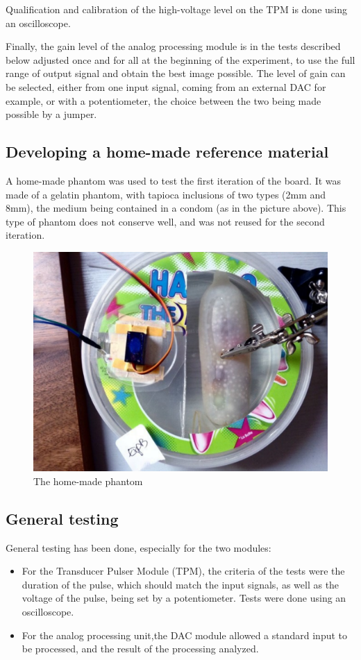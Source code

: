 \documentclass[letterpaper, 10 pt, conference]{ieeeconf} %
\begin{document}
Qualification and calibration of the high-voltage level on the TPM is done using an oscilloscope.

Finally, the gain level of the analog processing module is in the tests described below adjusted once and for all at the beginning of the experiment, to use the full range of output signal and obtain the best image possible. The level of gain can be selected, either from one input signal, coming from an external DAC for example, or with a potentiometer, the choice between the two being made possible by a jumper.

\subsection{Developing a home-made reference material}

A home-made phantom was used to test the first iteration of the board. It was made of a gelatin phantom, with tapioca inclusions of two types (2mm and 8mm), the medium being contained in a condom (as in the picture above). This type of phantom does not conserve well, and was not reused for the second iteration.

\begin{figure}%
\centering
\includegraphics[width=.8\linewidth]{phantom}
\caption{The home-made phantom}
\label{fig:phantom}
\end{figure}

\subsection{General testing}

General testing has been done, especially for the two modules:

\begin{itemize}
\item For the Transducer Pulser Module (TPM), the criteria of the tests were the duration of the pulse, which should match the input signals, as well as the voltage of the pulse, being set by a potentiometer. Tests were done using an oscilloscope.
\item For the analog processing unit,the DAC module allowed a standard input to be processed, and the result of the processing analyzed.
\end{itemize}
\end{document}
